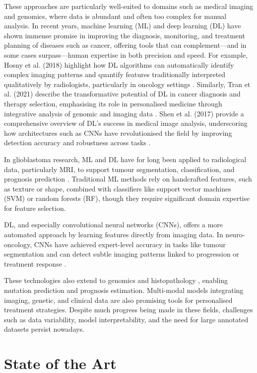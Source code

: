 \documentclass[12pt, a4paper]{report}
\begin{document}
These approaches are particularly well-suited to domains such as medical imaging and genomics, where data is abundant and often too complex for manual analysis. In recent years, machine learning (ML) and deep learning (DL) have shown immense promise in improving the diagnosis, monitoring, and treatment planning of diseases such as cancer, offering tools that can complement—and in some cases surpass—human expertise in both precision and speed. For example, Hosny et al. (2018) highlight how DL algorithms can automatically identify complex imaging patterns and quantify features traditionally interpreted qualitatively by radiologists, particularly in oncology settings \cite{Hosny2018}. Similarly, Tran et al. (2021) describe the transformative potential of DL in cancer diagnosis and therapy selection, emphasising its role in personalised medicine through integrative analysis of genomic and imaging data \cite{Tran2021}. Shen et al. (2017) provide a comprehensive overview of DL’s success in medical image analysis, underscoring how architectures such as CNNs have revolutionised the field by improving detection accuracy and robustness across tasks \cite{Shen2017}.

In glioblastoma research, ML and DL have for long been applied to radiological data, particularly MRI, to support tumour segmentation, classification, and prognosis prediction \cite{Dorfner2025}. Traditional ML methods rely on handcrafted features, such as texture or shape, combined with classifiers like support vector machines (SVM) or random forests (RF), though they require significant domain expertise for feature selection.

DL, and especially convolutional neural networks (CNNs), offers a more automated approach by learning features directly from imaging data. In neuro-oncology, CNNs have achieved expert-level accuracy in tasks like tumour segmentation and can detect subtle imaging patterns linked to progression or treatment response \cite{cancers16020300}.

These technologies also extend to genomics and histopathology \cite{Sultan2020}, enabling mutation prediction and prognosis estimation. Multi-modal models integrating imaging, genetic, and clinical data are also promising tools for personalised treatment strategies. Despite much progress being made in these fields, challenges such as data variability, model interpretability, and the need for large annotated datasets persist nowadays.

\section{State of the Art}
\end{document}

